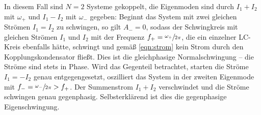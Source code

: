 In diesem Fall sind ${N=2}$ Systeme gekoppelt, die Eigenmoden sind durch ${I_1 + I_2}$ mit ${\omega _+}$ und ${I_1 - I_2}$ 
mit $\omega _-$ gegeben: 
Beginnt das System mit zwei gleichen Strömen ${I_1=I_2}$ zu schwingen, so gilt ${A_- = 0}$, sodass der Schwingkreis mit gleichen Strömen 
$I_1$ und $I_2$ mit der Frequenz ${f_+= \sfrac{\omega _+}{2\pi}}$, die ein einzelner LC-Kreis ebenfalls hätte, schwingt und gemäß 
\eqref{eqn:strom} kein Strom durch den Kopplungskondensator fließt. 
Dies ist die gleichphasige Normalschwingung -- die Ströme sind stets in Phase.
Wird das Gegenteil betrachtet, starten die Ströme $I_1=-I_2$ genau entgegengesetzt, oszilliert 
das System in der zweiten Eigenmode mit ${f_-=\sfrac{\omega _-}{2\pi} > f_+}$. 
Der Summenstrom $I_1 + I_2$ verschwindet und die Ströme schwingen genau gegenphasig. 
Selbsterklärend ist dies die gegenphasige Eigenschwingung. 

